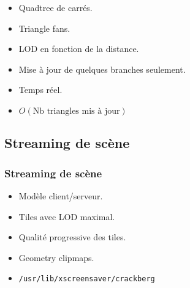 \documentclass[hyperref={pdfpagelabels=false}]{beamer}
\begin{document}
\begin{frame}
\begin{figure}[h]
  \end{figure}
  \begin{itemize}
  \item Quadtree de carrés.
  \item Triangle fans.
  \item LOD en fonction de la distance.
  \item Mise à jour de quelques branches seulement.
  \item Temps réel.
  \item $O(\text{Nb triangles mis à jour})$
  \end{itemize}
\end{frame}

\subsection{Streaming de scène}
\begin{frame}
  \frametitle{Streaming de scène}
  \begin{itemize}
  \item Modèle client/serveur.
  \item Tiles avec LOD maximal.
  \item Qualité progressive des tiles.
  \item Geometry clipmaps.
  \item \texttt{/usr/lib/xscreensaver/crackberg}
  \end{itemize}
\end{frame}


\end{document}
